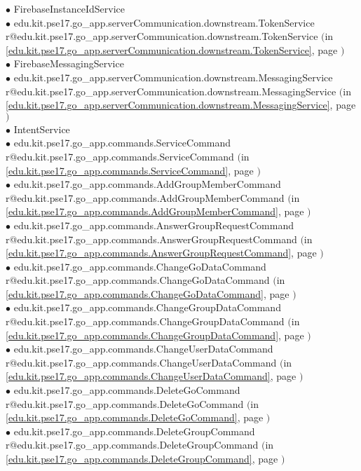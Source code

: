 \documentclass[11pt,a4paper]{report}
\makeatletter
\newcommand{\refdefined}[1]{
\expandafter\ifx\csname r@#1\endcsname\relax
\relax\else
{$($in \ref{#1}, page \pageref{#1}$)$}\fi}
\makeatother
\begin{document}
{{\hspace{1.0cm} $\bullet$ FirebaseInstanceIdService {\tiny } \\
\hspace{2.0cm} $\bullet$ edu.kit.pse17.go\_app.serverCommunication.downstream.TokenService {\tiny \refdefined{edu.kit.pse17.go_app.serverCommunication.downstream.TokenService}} \\
\hspace{1.0cm} $\bullet$ FirebaseMessagingService {\tiny } \\
\hspace{2.0cm} $\bullet$ edu.kit.pse17.go\_app.serverCommunication.downstream.MessagingService {\tiny \refdefined{edu.kit.pse17.go_app.serverCommunication.downstream.MessagingService}} \\
\hspace{1.0cm} $\bullet$ IntentService {\tiny } \\
\hspace{2.0cm} $\bullet$ edu.kit.pse17.go\_app.commands.ServiceCommand {\tiny \refdefined{edu.kit.pse17.go_app.commands.ServiceCommand}} \\
\hspace{3.0cm} $\bullet$ edu.kit.pse17.go\_app.commands.AddGroupMemberCommand {\tiny \refdefined{edu.kit.pse17.go_app.commands.AddGroupMemberCommand}} \\
\hspace{3.0cm} $\bullet$ edu.kit.pse17.go\_app.commands.AnswerGroupRequestCommand {\tiny \refdefined{edu.kit.pse17.go_app.commands.AnswerGroupRequestCommand}} \\
\hspace{3.0cm} $\bullet$ edu.kit.pse17.go\_app.commands.ChangeGoDataCommand {\tiny \refdefined{edu.kit.pse17.go_app.commands.ChangeGoDataCommand}} \\
\hspace{3.0cm} $\bullet$ edu.kit.pse17.go\_app.commands.ChangeGroupDataCommand {\tiny \refdefined{edu.kit.pse17.go_app.commands.ChangeGroupDataCommand}} \\
\hspace{3.0cm} $\bullet$ edu.kit.pse17.go\_app.commands.ChangeUserDataCommand {\tiny \refdefined{edu.kit.pse17.go_app.commands.ChangeUserDataCommand}} \\
\hspace{3.0cm} $\bullet$ edu.kit.pse17.go\_app.commands.DeleteGoCommand {\tiny \refdefined{edu.kit.pse17.go_app.commands.DeleteGoCommand}} \\
\hspace{3.0cm} $\bullet$ edu.kit.pse17.go\_app.commands.DeleteGroupCommand {\tiny \refdefined{edu.kit.pse17.go_app.commands.DeleteGroupCommand}} \\
}}
\end{document}
